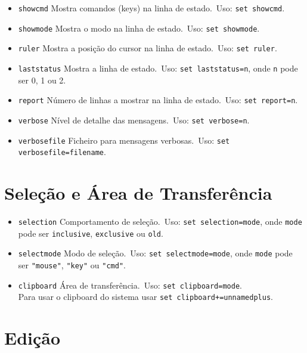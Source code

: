 \begin{itemize}
    \setlength{\itemsep}{-5pt} %
    \item \texttt{showcmd} Mostra comandos (keys) na linha de estado.\ Uso: \texttt{set showcmd}.
    \item \texttt{showmode} Mostra o modo na linha de estado.\ Uso: \texttt{set showmode}.
    \item \texttt{ruler} Mostra a posição do cursor na linha de estado.\ Uso: \texttt{set ruler}.
    \item \texttt{laststatus} Mostra a linha de estado.\ Uso: \texttt{set laststatus=n}, onde \texttt{n} pode ser 0, 1 ou 2.
    \item \texttt{report} Número de linhas a mostrar na linha de estado.\ Uso: \texttt{set report=n}.
    \item \texttt{verbose} Nível de detalhe das mensagens.\ Uso: \texttt{set verbose=n}.
    \item \texttt{verbosefile} Ficheiro para mensagens verbosas.\ Uso: \texttt{set verbosefile=filename}.
\end{itemize}

\section{Seleção e Área de Transferência}

\begin{itemize}
    \setlength{\itemsep}{-5pt} %
    \item \texttt{selection} Comportamento de seleção.\ Uso: \texttt{set selection=mode}, onde \texttt{mode} pode ser \texttt{inclusive}, \texttt{exclusive} ou \texttt{old}.
    \item \texttt{selectmode} Modo de seleção.\ Uso: \texttt{set selectmode=mode}, onde \texttt{mode} pode ser \texttt{"mouse"}, \texttt{"key"} ou \texttt{"cmd"}.
    \item \texttt{clipboard} Área de transferência.\ Uso: \texttt{set clipboard=mode}.\\Para usar o clipboard do sistema usar \texttt{set clipboard+=unnamedplus}.
\end{itemize}

\section{Edição}

